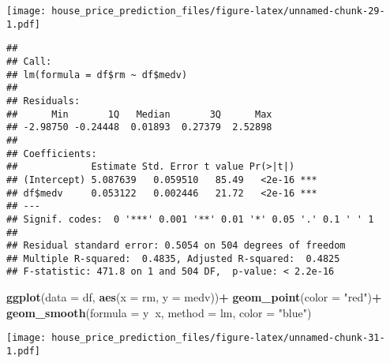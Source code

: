 \documentclass[
]{article}
\newenvironment{Shaded}{\begin{snugshade}}{\end{snugshade}}
\newcommand{\DataTypeTok}[1]{\textcolor[rgb]{0.13,0.29,0.53}{#1}}
\newcommand{\KeywordTok}[1]{\textcolor[rgb]{0.13,0.29,0.53}{\textbf{#1}}}
\newcommand{\NormalTok}[1]{#1}
\newcommand{\OperatorTok}[1]{\textcolor[rgb]{0.81,0.36,0.00}{\textbf{#1}}}
\newcommand{\StringTok}[1]{\textcolor[rgb]{0.31,0.60,0.02}{#1}}
\begin{document}
\texttt{[image: house\_price\_prediction\_files/figure-latex/unnamed-chunk-29-1.pdf]}

\begin{Shaded}
\end{Shaded}

\begin{verbatim}
## 
## Call:
## lm(formula = df$rm ~ df$medv)
## 
## Residuals:
##      Min       1Q   Median       3Q      Max 
## -2.98750 -0.24448  0.01893  0.27379  2.52898 
## 
## Coefficients:
##             Estimate Std. Error t value Pr(>|t|)    
## (Intercept) 5.087639   0.059510   85.49   <2e-16 ***
## df$medv     0.053122   0.002446   21.72   <2e-16 ***
## ---
## Signif. codes:  0 '***' 0.001 '**' 0.01 '*' 0.05 '.' 0.1 ' ' 1
## 
## Residual standard error: 0.5054 on 504 degrees of freedom
## Multiple R-squared:  0.4835, Adjusted R-squared:  0.4825 
## F-statistic: 471.8 on 1 and 504 DF,  p-value: < 2.2e-16
\end{verbatim}

\begin{Shaded}
\begin{Highlighting}[]
\KeywordTok{ggplot}\NormalTok{(}\DataTypeTok{data =}\NormalTok{ df, }\KeywordTok{aes}\NormalTok{(}\DataTypeTok{x =}\NormalTok{ rm, }\DataTypeTok{y =}\NormalTok{ medv))}\OperatorTok{+}
\StringTok{  }\KeywordTok{geom_point}\NormalTok{(}\DataTypeTok{color =} \StringTok{"red"}\NormalTok{)}\OperatorTok{+}
\StringTok{  }\KeywordTok{geom_smooth}\NormalTok{(}\DataTypeTok{formula =}\NormalTok{ y}\OperatorTok{~}\NormalTok{x, }\DataTypeTok{method =}\NormalTok{ lm, }\DataTypeTok{color =} \StringTok{"blue"}\NormalTok{)}
\end{Highlighting}
\end{Shaded}

\texttt{[image: house\_price\_prediction\_files/figure-latex/unnamed-chunk-31-1.pdf]}

\begin{Shaded}
\end{Shaded}
\end{document}
